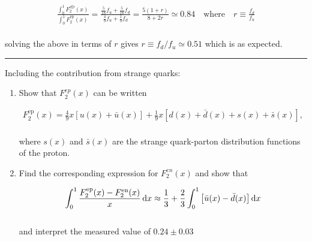 \begin{solution}
    \begin{align*}
        \frac{\int_0^1 F_2^\text{eD}(x)}{\int_0^1 F_2^\text{ep}(x)} = \frac{\frac{5}{18}f_u + \frac{5}{18}f_d}{\frac{4}{9}f_u + \frac{1}{9}f_d} = \frac{5(1+r)}{8+2r} \simeq 0.84 \quad \text{where} \quad r \equiv \frac{f_d}{f_u}
    \end{align*}\\
    solving the above in terms of $r$ gives $\boxed{r\equiv f_d/f_u \simeq 0.51}$ which is as expected.
\end{solution}

\noindent\rule{7in}{1.5pt}


\begin{problem}{8.7}
    Including the contribution from strange quarks:

    \begin{enumerate}[label=(\alph*)]
        \item Show that $F_2^{ep}(x)$ can be written 
        
        \begin{align*}
            F_2^{\text{ep}}(x) = \frac{4}{9} x \left[ u(x) + \bar{u}(x) \right] + \frac{1}{9} x \left[ d(x) + \bar{d}(x) + s(x) + \bar{s}(x) \right],
        \end{align*}\\
        where $s(x)$ and $\bar{s}(x)$ are the strange quark-parton distribution functions of the proton.
        \item Find the corresponding expression for $F_2^{en}(x)$ and show that
        
        \begin{align*}
            \int_0^1 \frac{F^{\text{ep}}_2(x)-F^{\text{en}}_2(x)}{x} \mathop{}\!\mathrm{d} x \approx \frac{1}{3} + \frac{2}{3} \int_0^1 \left[ \bar{u}(x) - \bar{d}(x) \right] \mathop{}\!\mathrm{d} x
        \end{align*}\\
        and interpret the measured value of $0.24\pm 0.03$
    \end{enumerate}
\end{problem}

